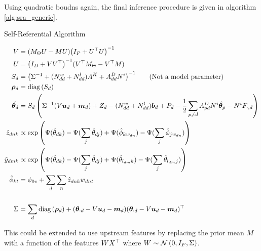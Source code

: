 Using quadratic boudns again, the final inference procedure is given in algorithm \ref{alg:sra_generic}.

\begin{algorithm}
\caption{Self-Referential Algorithm}
\label{alg:sra_generic}
    \begin{align*}
        V & = (M_\Theta U - M U){\left( I_P + U^\top U \right)}^{-1} \\
        U & = {\left( I_D + V V^\top \right)}^{-1}(V^\top M_\Theta - V^\top M) \\
        S_d & = {\left( {\Sigma}^{-1} + (N^w_{dd} + N^l_{dd})A^K + A^D_{dd} N^i \right)}^{-1} \qquad \text{(Not a model parameter)}\\
        \bm \rho_d & = \text{diag} \left( {S_d} \right) \\
        \hat{{ \bm \theta_d }} & = S_d
\left( 
    {\Sigma}^{-1}(V \bm u_d + \bm m_d) + Z_d - (N^w_{dd} + N^l_{dd}) \bm b_d + P_d - \frac{1}{2} \sum_{p \neq d} A^D_{pd} N^i \hat{\bm \theta}_p - N^i F_{\cdot, d}
\right) \\
        \hat{z}_{dnk} & \propto \exp\left(\Psi(\hat{\theta}_{dk}) - \Psi(\sum_j \hat{\theta}_{dj}) + \Psi(\hat{\phi}_{kw_{dn}}) - \Psi(\sum_j \hat{\phi}_{jw_{dn}})\right) \\
        \hat{y}_{dmk} & \propto \exp\left(\Psi(\hat{\theta}_{dk}) - \Psi(\sum_j \hat{\theta}_{dj}) + \Psi(\hat{\theta}_{l_{dm}k}) - \Psi(\sum_j \hat{\theta}_{l_{dm}j})\right) \\
        \hat{\phi}_{kt} & = \phi_{0v} + \sum_d \sum_n \hat{z}_{dnk} w_{dnt} \\
        \qquad & \qquad \\
        \Sigma & = \sum_d \text{diag} \left( {\bm \rho_d} \right) + ({ \bm \theta_{\cdot d} } - V \bm u_d - \bm m_d)({ \bm \theta_{\cdot d} } - V \bm u_d - \bm m_d)^\top
    \end{align*}
\end{algorithm}

This could be extended to use upstream features by replacing the prior mean $M$ with a function of the features $W X^\top$ where $W \sim \mathcal{N} \left(0, I_F, \Sigma\right)$.



